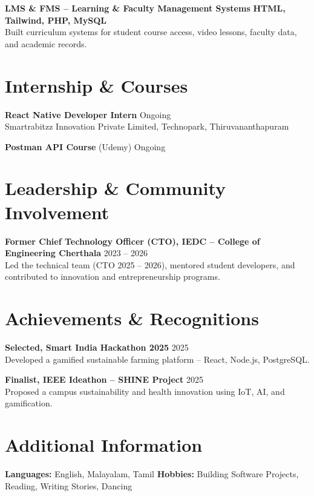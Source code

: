 \documentclass[a4paper,11pt]{article}
\begin{document}
\vspace{3pt}
\noindent\textbf{LMS \& FMS -- Learning \& Faculty Management Systems} \hfill \textbf{HTML, Tailwind, PHP, MySQL}\\
Built curriculum systems for student course access, video lessons, faculty data, and academic records.

\section*{Internship \& Courses}

\noindent\textbf{React Native Developer Intern} \hfill Ongoing\\
Smartrabitzz Innovation Private Limited, Technopark, Thiruvananthapuram

\noindent\textbf{Postman API Course} (Udemy) \hfill Ongoing

\section*{Leadership \& Community Involvement}

\noindent
\textbf{Former Chief Technology Officer (CTO), IEDC -- College of Engineering Cherthala}
\hfill
2023 -- 2026\\
Led the technical team (CTO 2025 -- 2026), mentored student developers, and contributed to innovation and entrepreneurship programs.

\section*{Achievements \& Recognitions}
\noindent\textbf{Selected, Smart India Hackathon 2025} \hfill 2025\\
Developed a gamified sustainable farming platform -- React, Node.js, PostgreSQL.

\noindent\textbf{Finalist, IEEE Ideathon -- SHINE Project} \hfill 2025\\
Proposed a campus sustainability and health innovation using IoT, AI, and gamification.

\section*{Additional Information}

\noindent
\textbf{Languages:}
English, Malayalam, Tamil
\hfill
\textbf{Hobbies:}
Building Software Projects, Reading, Writing Stories, Dancing
\end{document}
